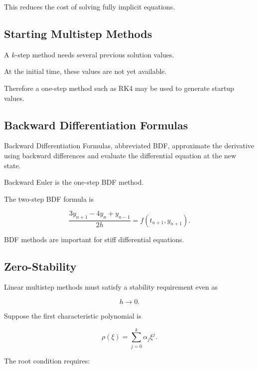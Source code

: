 This reduces the cost of solving fully implicit equations.

\subsection{Starting Multistep Methods}
\label{subsec:starting-multistep-methods}

A \(k\)-step method needs several previous solution values.

At the initial time, these values are not yet available.

Therefore a one-step method such as RK4 may be used to generate startup
values.

\subsection{Backward Differentiation Formulas}
\label{subsec:backward-differentiation-formulas}

Backward Differentiation Formulas, abbreviated BDF, approximate the
derivative using backward differences and evaluate the differential
equation at the new state.

Backward Euler is the one-step BDF method.

The two-step BDF formula is

\[
\boxed{
\frac{
3y_{n+1}-4y_n+y_{n-1}
}{
2h
}
=
f(t_{n+1},y_{n+1}).
}
\]

BDF methods are important for stiff differential equations.

\subsection{Zero-Stability}
\label{subsec:zero-stability}

Linear multistep methods must satisfy a stability requirement even as

\[
h\to0.
\]

Suppose the first characteristic polynomial is

\[
\boxed{
\rho(\xi)
=
\sum_{j=0}^{k}
\alpha_j\xi^j.
}
\]

The root condition requires:

